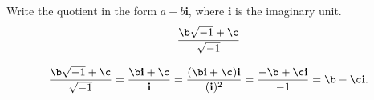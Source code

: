 









Write the quotient in the form $a+b\mathbf{i}$, where $\mathbf{i}$ is the imaginary unit. 
\[
\frac{\b\sqrt{-1}+\c}{\sqrt{-1}}
\]

\begin{solution}
\[
    \frac{\b\sqrt{-1}+\c}{\sqrt{-1}}
=     \frac{\b\mathbf{i}+\c}{\mathbf{i}} 
= \frac{(\b\mathbf{i}+\c)\mathbf{i}}{(\mathbf{i})^2}
= 
  \frac
  {
    -\b+\c\mathbf{i} 
  }
  {
    -1
  }
= 
 \b-\c\mathbf{i}
.
\]

\end{solution}